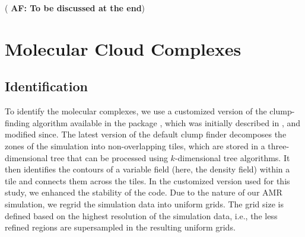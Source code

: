 \IfFileExists{emulateapjlegacy.cls}{\documentclass[iop]{emulateapjlegacy}}{\documentclass[iop]{emulateapj}}
\newcommand{\AF}[1]{({\bf \color{afcolor} AF: #1})}
\begin{document}
\AF{To be discussed at the end}

\section{Molecular Cloud Complexes}\label{sec:eqn}

\subsection{Identification}\label{sec:method}

To identify the molecular complexes, we use a customized version of
the clump-finding algorithm available in the  package
 \citep{Turk11a}, which was initially described in
\citet{Smith09a}, 
     and modified since.
The latest version of the default  clump finder decomposes
the zones of the simulation into non-overlapping tiles, which are
stored in a 
     three-dimensional tree that can be processed using $k$-dimensional tree algorithms.
It then identifies the contours of a variable field (here, the density
field) within a tile and connects them across the tiles. In the
customized version used for this study, we
     enhanced
the stability of the code.
%
Due to the nature of our AMR simulation, we regrid the simulation data into uniform grids. The grid size is defined based on the highest resolution of the simulation data, i.e., the less refined regions are supersampled in the resulting uniform grids.
\end{document}
